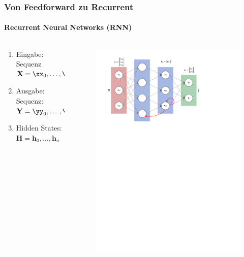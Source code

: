 \documentclass[german,aspectratio=169]{beamer}
\begin{document}
\begin{frame}
	\frametitle{Von Feedforward zu Recurrent}
	\framesubtitle{Recurrent Neural Networks (RNN)}
	\begin{columns}
		\begin{column}{0.3\textwidth}
			\begin{enumerate}[label=$\bullet$]
				\item Eingabe: Sequenz $\mathbf{X} = \xx_0, \ldots, \xx_n$
				\item Ausgabe: Sequenz: $\mathbf{Y} = \yy_0, \ldots, \yy_n$
				\item Hidden States: $\mathbf{H} = \mathbf{h}_0, \ldots, \mathbf{h}_n$
			\end{enumerate}
		\end{column}
		\begin{column}{0.7\textwidth}
			\begin{figure}
				\includegraphics[width=\textwidth]{rnn-labeled}
			\end{figure}
		\end{column}
	\end{columns}
\end{frame}
\end{document}
